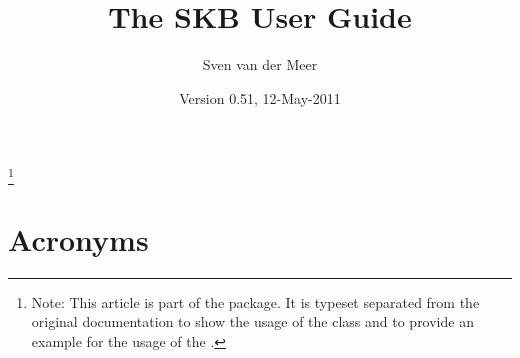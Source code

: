\documentclass{skbarticle}
\begin{document}
  \title{The SKB User Guide}
  \author{Sven van der Meer}
  \date{Version 0.51, 12-May-2011}
  \maketitle

  \begin{abstract}
  \end{abstract}
  \footnote{
      Note: This article is part of the  package. It is typeset separated from 
      the original documentation to show the usage of the \cmd{\skbarticle} class
      and to provide an example for the usage of the .
  }

  \tableofcontents*



  \section*{Acronyms}
    \skbacronyms

  \printbibliography
\end{document}
